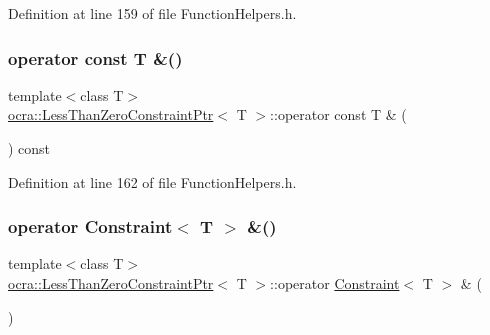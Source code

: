 Definition at line 159 of file Function\+Helpers.\+h.

\hypertarget{classocra_1_1LessThanZeroConstraintPtr_a8324e8f7ff78c3eeda3a4420d36e3669}{}\label{classocra_1_1LessThanZeroConstraintPtr_a8324e8f7ff78c3eeda3a4420d36e3669} 
\subsubsection{\texorpdfstring{operator const T \&()}{operator const T \&()}}
{\footnotesize\ttfamily template$<$class T$>$ \\
\hyperlink{classocra_1_1LessThanZeroConstraintPtr}{ocra\+::\+Less\+Than\+Zero\+Constraint\+Ptr}$<$ T $>$\+::operator const T \& (\begin{DoxyParamCaption}{ }\end{DoxyParamCaption}) const\hspace{0.3cm}{\ttfamily [inline]}}



Definition at line 162 of file Function\+Helpers.\+h.

\hypertarget{classocra_1_1LessThanZeroConstraintPtr_a028c60ee38fce1047142de48acb1dae5}{}\label{classocra_1_1LessThanZeroConstraintPtr_a028c60ee38fce1047142de48acb1dae5} 
\subsubsection{\texorpdfstring{operator Constraint$<$ T $>$ \&()}{operator Constraint< T > \&()}}
{\footnotesize\ttfamily template$<$class T$>$ \\
\hyperlink{classocra_1_1LessThanZeroConstraintPtr}{ocra\+::\+Less\+Than\+Zero\+Constraint\+Ptr}$<$ T $>$\+::operator \hyperlink{classocra_1_1Constraint}{Constraint}$<$ T $>$ \& (\begin{DoxyParamCaption}{ }\end{DoxyParamCaption})\hspace{0.3cm}{\ttfamily [inline]}}




